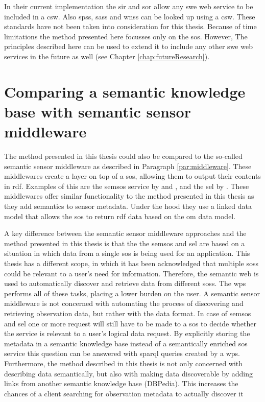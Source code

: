 In their current implementation the \ac{sir} and \ac{sor} allow any \ac{swe} web service to be included in a \ac{csw}. Also \aclp{sps}, \aclp{sas} and \aclp{wns} can be looked up using a \ac{csw}. These standards have not been taken into consideration for this thesis. Because of time limitations the method presented here focusses only on the \ac{sos}. However, The principles described here can be used to extend it to include any other \ac{swe} web services in the future as well (see Chapter \ref{chap:futureResearch}).        

\section{Comparing a semantic knowledge base with semantic sensor middleware}
The method presented in this thesis could also be compared to the so-called semantic sensor middleware as described in Paragraph \ref{par:middleware}. These middlewares create a layer on top of a \ac{sos}, allowing them to output their contents in \ac{rdf}. Examples of this are the \acf{semsos} service by \cite{SSW:Henson} and \cite{SSW:Pschorr}, and the \acf{sel} by \cite{SSW:Janowicz}. These middlewares offer similar functionality to the method presented in this thesis as they add semantics to sensor metadata. Under the hood they use a linked data model that allows the \ac{sos} to return \ac{rdf} data based on the \ac{om} data model. 

A key difference between the semantic sensor middleware approaches and the method presented in this thesis is that the the \ac{semsos} and \ac{sel} are based on a situation in which data from a single \ac{sos} is being used for an application. This thesis has a different scope, in which it has been acknowledged that multiple \aclp{sos} could be relevant to a user's need for information. Therefore, the semantic web is used to automatically discover and retrieve data from different \aclp{sos}. The \ac{wps} performs all of these tasks, placing a lower burden on the user. A semantic sensor middleware is not concerned with automating the process of discovering and retrieving observation data, but rather with the data format. In case of \ac{semsos} and \ac{sel} one or more request will still have to be made to a \ac{sos} to decide whether the service is relevant to a user's logical data request. By explicitly storing the metadata in a semantic knowledge base instead of a semantically enriched \ac{sos} service this question can be answered with \ac{sparql} queries created by a \ac{wps}. Furthermore, the method described in this thesis is not only concerned with describing data semantically, but also with making data discoverable by adding links from another semantic knowledge base (DBPedia). This increases the chances of a client searching for observation metadata to actually discover it        

